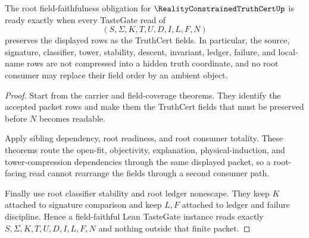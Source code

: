 \begin{theorem}
\label{thm:reality-constrained-truth-cert-root-field-faithful-readiness}
The root field-faithfulness obligation for $\RealityConstrainedTruthCertUp$ is
ready exactly when every TasteGate read of
$$
(S,\Sigma,K,T,U,D,I,L,F,N)
$$
preserves the displayed rows as the TruthCert fields. In particular, the
source, signature, classifier, tower, stability, descent, invariant, ledger,
failure, and local-name rows are not compressed into a hidden truth
coordinate, and no root consumer may replace their field order by an ambient
object.
\end{theorem}
\begin{proof}
Start from the carrier and field-coverage theorems. They identify the accepted
packet rows and make them the TruthCert fields that must be preserved before
$N$ becomes readable.

Apply sibling dependency, root readiness, and root consumer totality. These
theorems route the open-fit, objectivity, explanation, physical-induction, and
tower-compression dependencies through the same displayed packet, so a
root-facing read cannot rearrange the fields through a second consumer path.

Finally use root classifier stability and root ledger nonescape. They keep
$K$ attached to signature comparison and keep $L,F$ attached to ledger and
failure discipline. Hence a field-faithful Lean TasteGate instance reads
exactly $S,\Sigma,K,T,U,D,I,L,F,N$ and nothing outside that finite packet.
\end{proof}
